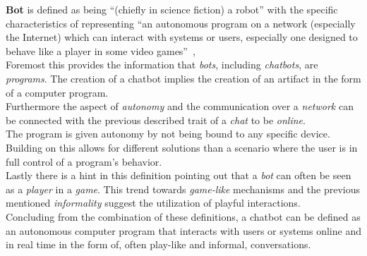 \textbf{Bot} is defined as being ``(chiefly in science fiction) a robot'' with the specific characteristics of representing ``an autonomous program on a network (especially the Internet) which can interact with systems or users, especially one designed to behave like a player in some video games''~\cite{oxfordbot},
\\

Foremost this provides the information that \emph{bots}, including \emph{chatbots}, are \emph{programs}.
The creation of a chatbot implies the creation of an artifact in the form of a computer program.
\\

Furthermore the aspect of \emph{autonomy} and the communication over a \emph{network} can be connected with the previous described trait of a \emph{chat} to be \emph{online}.
\\
The program is given autonomy by not being bound to any specific device.
Building on this allows for different solutions than a scenario where the user is in full control of a program's behavior.
\\

Lastly there is a hint in this definition pointing out that a \emph{bot} can often be seen as a \emph{player} in a \emph{game}.
This trend towards \emph{game-like} mechanisms and the previous mentioned \emph{informality} suggest the utilization of playful interactions.
\\

Concluding from the combination of these definitions, a chatbot can be defined as an autonomous computer program that interacts with users or systems online and in real time in the form of, often play-like and informal, conversations.
